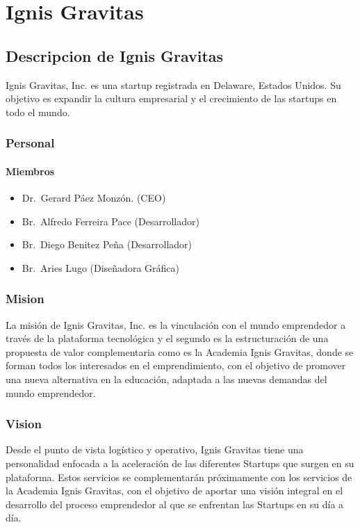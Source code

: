 \chapter{Ignis Gravitas}

\section{Descripcion de Ignis Gravitas} \label{App:DescripcionLasdai}

Ignis Gravitas, Inc. es una startup registrada en Delaware, Estados Unidos. Su objetivo es expandir la cultura empresarial y el crecimiento de las startups en todo el mundo.

\subsection{Personal}

\subsubsection{Miembros}

\begin{itemize}
    \itemsep1pt \parskip0pt 
    \item Dr.\ Gerard Páez Monzón. (CEO)
    \item Br.\ Alfredo Ferreira Pace (Desarrollador)
    \item Br.\ Diego Benitez Peña (Desarrollador)
    \item Br.\ Aries Lugo (Diseñadora Gráfica)
\end{itemize}

\subsection{Mision}

La misión de Ignis Gravitas, Inc. es la vinculación con el mundo emprendedor a través de la plataforma tecnológica y el segundo es la estructuración de una propuesta de valor complementaria como es la Academia Ignis Gravitas, donde se forman todos los interesados en el emprendimiento, con el objetivo de promover una nueva alternativa en la educación, adaptada a las nuevas demandas del mundo emprendedor.

\subsection{Vision}

Desde el punto de vista logístico y operativo, Ignis Gravitas tiene una personalidad enfocada a la aceleración de las diferentes Startups que surgen en su plataforma. Estos servicios se complementarán próximamente con los servicios de la Academia Ignis Gravitas, con el objetivo de aportar una visión integral en el desarrollo del proceso emprendedor al que se enfrentan las Startups en su día a día.

